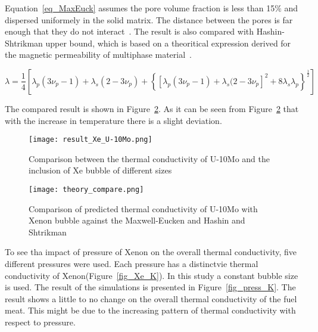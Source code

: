 \begin{doublespacing}
Equation~\ref{eq_MaxEuck} assumes the pore volume fraction is less than 15$\%$ and dispersed uniformely in the solid matrix. The distance between the pores is far enough that they do not interact~\cite{clark2003monolithic,smith2013thermal}. The result is also compared with  Hashin-Shtrikman upper bound, which is based on a theoritical expression derived for the magnetic permeability of multiphase material~\cite{hashin1962variational}. 

\begin{equation}
\lambda = \frac{1}{4}\left [ \lambda_p(3\nu_p-1) + \lambda_s(2-3\nu_p) + \left \{ \left[ \lambda_p (3\nu_p -1) + \lambda_s(2-3\nu_p \right ]^2 + 8\lambda_s\lambda_p \right \}^\frac{1}{2} \right ]
\end{equation}



The compared result is shown in Figure~\ref{fig_compare}. As it can be seen from Figure~\ref{fig_compare} that with the increase in temperature there is a slight deviation.

\begin{figure}[H]
\centering
\texttt{[image: result\_Xe\_U-10Mo.png]}
\caption{Comparison between the thermal conductivity of U-10Mo and the inclusion of Xe bubble of different sizes}
\label{fig_result}
\end{figure}

\iffalse
FEM calculations were performed on \ref{fcc_mesh} in order to calculate the thermal flux and the thermal conductivity in 2D. Since thermal conductivity of Xenon is a function of both temperature and pressure, six different pressure has been chosen to represend the conductivity (Figure~\ref{fig_Xe_K}). Eventhough the dependence of thermal conductivity is evident, the results show no change in the overall thermal conductivity in the fuel. Pressure in the bubble is significantly higher than the 1000 bar in some situation~\cite{xiao2015atomistic}. The increased pressure inside the bubble creates another probability of having phase change from gas to solid~\cite{zheng2014thermodynamics}. The resluts show that with the increased pressure inside the Xenon bubble, the overall thermal conductivity has a very negligible effect. 
\fi

\begin{figure}[H]
	\centering
	\texttt{[image: theory\_compare.png]}
	\caption{Comparison of predicted thermal conductivity of U-10Mo with Xenon bubble against the Maxwell-Eucken and Hashin and Shtrikman }
	\label{fig_compare}
	\end{figure}
To see tha impact of pressure of Xenon on the overall thermal conductivity, five different pressures were used. Each pressure has a distinctvie thermal conductivity of Xenon(Figure~\ref{fig_Xe_K}). In this study a constant bubble size is used. The result of the simulations is presented in Figure~\ref{fig_press_K}. The result shows a little to no change on the overall thermal conductivity of the fuel meat. This might be due to the increasing pattern of thermal conductivity with respect to pressure.  


\end{doublespacing}
